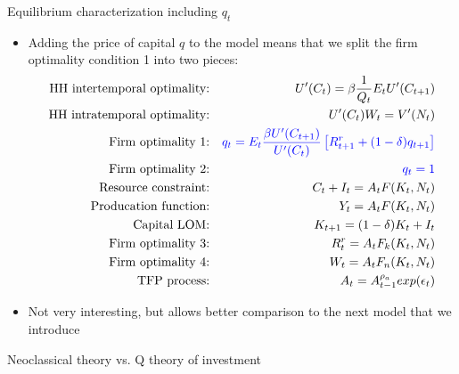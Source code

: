 \documentclass[9pt,xcolor={dvipsnames}]{beamer}
\newcommand{\bit}{\begin{itemize}}
\newcommand{\eit}{\end{itemize}}
\newcommand{\bc}{\color{blue}}
\begin{document}
\begin{frame}{Equilibrium characterization including $q_t$}

\bit
\setlength\itemsep{1.5em} 

\item Adding the price of capital $q$ to the model means that we split the firm optimality condition 1 into two pieces:
\begin{eqnarray}
\text{HH intertemporal optimality:} && U'(C_t) = \beta\frac{1}{Q_t} E_t U'(C_{t+1}) \nonumber \\
\text{HH intratemporal optimality:} && U'(C_t)W_t = V'(N_t) \nonumber \\
\text{Firm optimality 1:} && {\bc q_t = E_t \frac{\beta U'(C_{t+1})}{U'(C_{t})} \left[R^r_{t+1} + (1-\delta)q_{t+1} \right]}  \nonumber \\ 
\text{Firm optimality 2:} && {\bc q_t = 1} \nonumber \\
\text{Resource constraint:} && C_t + I_t = A_t F(K_t, N_t) \nonumber \\
\text{Producation function:} && Y_t = A_t F(K_t, N_t) \nonumber \\
\text{Capital LOM:} && K_{t+1} = (1-\delta) K_t + I_t \nonumber \\
\text{Firm optimality 3:} && R^{r}_t = A_t F_k (K_t, N_t) \nonumber \\
\text{Firm optimality 4:} && W_t = A_t F_n (K_t, N_t) \nonumber \\
\text{TFP process:} && A_t = A_{t-1}^{\rho_a}exp(\epsilon_t) \nonumber
\end{eqnarray}

\item Not very interesting, but allows better comparison to the next model that we introduce

\eit

\end{frame}



\begin{frame}

\begin{center}
	\huge Neoclassical theory vs. Q theory of investment \normalfont
\end{center}

\end{frame}
\end{document}
